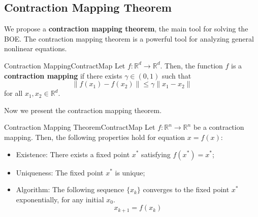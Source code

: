     \subsection{Contraction Mapping Theorem}
        We propose a \textbf{contraction mapping theorem}, the main tool for solving the BOE.
        The contraction mapping theorem is a powerful tool for analyzing general nonlinear equations.
        \begin{defn}{Contraction Mapping}{ContractMap}
            Let $f : \mathbb{R}^d \to \mathbb{R}^d$. Then, the function $f$ is a \textbf{contraction mapping}
            if there exists $\gamma \in (0,1)$ such that
            \begin{equation}
                \|f(x_1) - f(x_2)\| \leq \gamma \|x_1-x_2\|
            \end{equation}
            for all $x_1,x_2 \in \mathbb{R}^d$.
        \end{defn}
        Now we present the contraction mapping theorem.
        \begin{thm}{Contraction Mapping Theorem}{ContractMap}
            Let $f:\mathbb{R}^n \to \mathbb{R}^n$ be a contraction mapping. Then, the following properties hold for equation $x=f(x)$:
            \begin{itemize}
                \item Existence: There exists a fixed point $x^*$ satisfying $f(x^*)=x^*$;
                \item Uniqueness: The fixed point $x^*$ is unique;
                \item Algorithm: The following sequence $\{x_k\}$ converges to the fixed point $x^*$ exponentially, for any initial $x_0$.
                    \begin{equation}
                        x_{k+1} = f(x_k)
                    \end{equation}
            \end{itemize}
        \end{thm}
